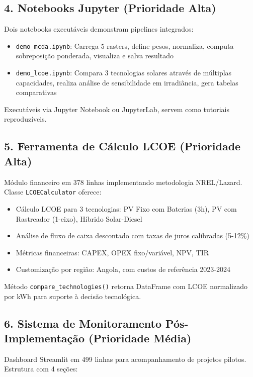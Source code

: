 \documentclass[12pt, a4paper]{article}
\begin{document}
\subsection{4. Notebooks Jupyter (Prioridade Alta)}

Dois notebooks executáveis demonstram pipelines integrados:

\begin{itemize}
    \item \texttt{demo\_mcda.ipynb}: Carrega 5 rasters, define pesos, normaliza, computa sobreposição ponderada, visualiza e salva resultado
    \item \texttt{demo\_lcoe.ipynb}: Compara 3 tecnologias solares através de múltiplas capacidades, realiza análise de sensibilidade em irradiância, gera tabelas comparativas
\end{itemize}

Executáveis via Jupyter Notebook ou JupyterLab, servem como tutoriais reproduzíveis.

\subsection{5. Ferramenta de Cálculo LCOE (Prioridade Alta)}

Módulo financeiro em 378 linhas implementando metodologia NREL/Lazard. Classe \texttt{LCOECalculator} oferece:

\begin{itemize}
    \item Cálculo LCOE para 3 tecnologias: PV Fixo com Baterias (3h), PV com Rastreador (1-eixo), Híbrido Solar-Diesel
    \item Análise de fluxo de caixa descontado com taxas de juros calibradas (5-12\%)
    \item Métricas financeiras: CAPEX, OPEX fixo/variável, NPV, TIR
    \item Customização por região: Angola, com custos de referência 2023-2024
\end{itemize}

Método \texttt{compare\_technologies()} retorna DataFrame com LCOE normalizado por kWh para suporte à decisão tecnológica.

\subsection{6. Sistema de Monitoramento Pós-Implementação (Prioridade Média)}

Dashboard Streamlit em 499 linhas para acompanhamento de projetos pilotos. Estrutura com 4 seções:
\end{document}
